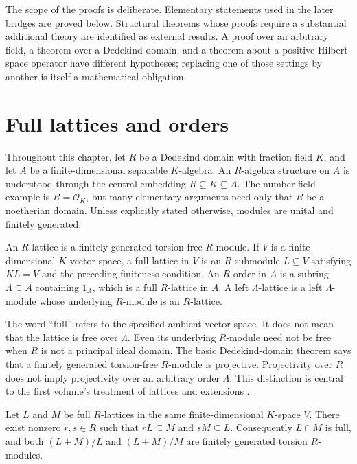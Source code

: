 The scope of the proofs is deliberate. Elementary statements used in
the later bridges are proved below. Structural theorems whose proofs
require a substantial additional theory are identified as external
results. A proof over an arbitrary field, a theorem over a Dedekind
domain, and a theorem about a positive Hilbert-space operator have
different hypotheses; replacing one of those settings by another is
itself a mathematical obligation.

\section{Full lattices and orders}

Throughout this chapter, let $R$ be a Dedekind domain with fraction
field $K$, and let $A$ be a finite-dimensional separable $K$-algebra.
An $R$-algebra structure on $A$ is understood through the central
embedding $R\subseteq K\subseteq A$. The number-field example is
$R=\mathcal O_K$, but many elementary arguments need only that $R$ be
a noetherian domain. Unless explicitly stated otherwise, modules are
unital and finitely generated.

\begin{definition}
An $R$-lattice is a finitely generated torsion-free $R$-module. If $V$
is a finite-dimensional $K$-vector space, a full lattice in $V$ is an
$R$-submodule $L\subseteq V$ satisfying $K L=V$ and the preceding
finiteness condition. An $R$-order in $A$ is a subring
$\Lambda\subseteq A$ containing $1_A$, which is a full $R$-lattice
in $A$. A left $\Lambda$-lattice is a left $\Lambda$-module whose
underlying $R$-module is an $R$-lattice.
\end{definition}

The word ``full'' refers to the specified ambient vector space. It
does not mean that the lattice is free over $\Lambda$. Even its
underlying $R$-module need not be free when $R$ is not a principal
ideal domain. The basic Dedekind-domain theorem says that a finitely
generated torsion-free $R$-module is projective. Projectivity over $R$
does not imply projectivity over an arbitrary order $\Lambda$.
This distinction is central to the first volume's treatment of
lattices and extensions \cite[Chs.~I and IV]{RoggenkampHuberDyson1970}.

\begin{proposition}
\label{prop:common-denominators}
Let $L$ and $M$ be full $R$-lattices in the same finite-dimensional
$K$-space $V$. There exist nonzero $r,s\in R$ such that
$rL\subseteq M$ and $sM\subseteq L$. Consequently $L\cap M$ is
full, and both $(L+M)/L$ and $(L+M)/M$ are finitely generated torsion
$R$-modules.
\end{proposition}

